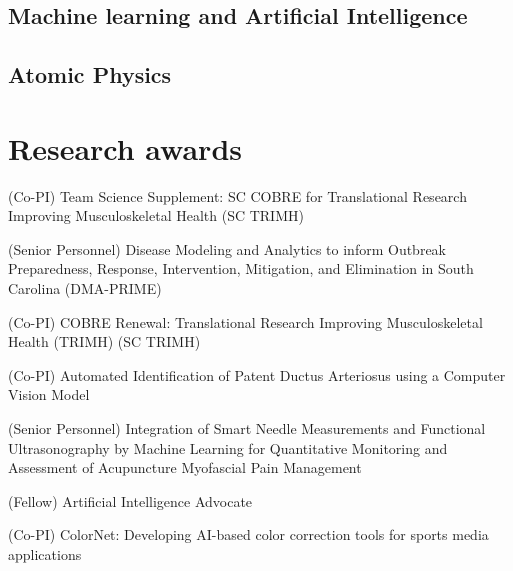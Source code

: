 \documentclass[11pt,letterpaper,roman]{moderncv}        %
\begin{document}
\subsection{Machine learning and Artificial Intelligence}

\begin{refsection}
  \nocite{*}
  \printbibliography[heading=none]
\end{refsection}

\subsection{Atomic Physics}

\begin{refsection}
  \nocite{*}
  \printbibliography[heading=none]
\end{refsection}

\section{Research awards}

\quad (Co-PI) Team Science Supplement: SC COBRE for Translational Research Improving Musculoskeletal Health (SC TRIMH)

\quad (Senior Personnel) Disease Modeling and Analytics to inform Outbreak Preparedness, Response, Intervention, Mitigation, and Elimination in South Carolina (DMA-PRIME)

\quad (Co-PI) COBRE Renewal: Translational Research Improving Musculoskeletal Health (TRIMH) (SC TRIMH)

\quad (Co-PI) Automated Identification of Patent Ductus Arteriosus using a Computer Vision Model

\quad (Senior Personnel) Integration of Smart Needle Measurements and Functional Ultrasonography by Machine Learning for Quantitative Monitoring and Assessment of Acupuncture Myofascial Pain Management

\quad (Fellow) Artificial Intelligence Advocate

\quad (Co-PI) ColorNet: Developing AI-based color correction tools for sports media applications
\end{document}
